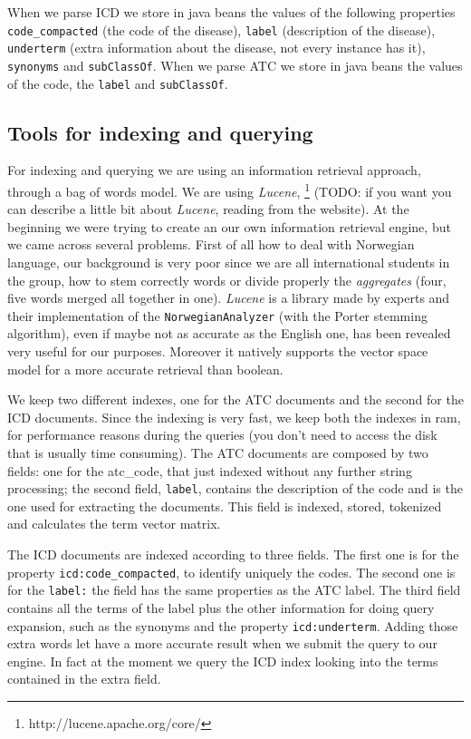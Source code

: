 \documentclass{article}
\begin{document}
When we parse ICD we store in java beans the values of the following properties \texttt{code\_compacted} (the code of the disease), \texttt{label} (description of the disease), \texttt{underterm} (extra information about the disease, not every instance has it), \texttt{synonyms} and \texttt{subClassOf}.
When we parse ATC we store in java beans the values of the code, the \texttt{label} and \texttt{subClassOf}.

\subsection{Tools for indexing and querying}
For indexing and querying we are using an information retrieval approach, through a bag of words model. We are using \emph{Lucene}, \footnote{http://lucene.apache.org/core/}  (TODO: if you want you can describe a little bit about \emph{Lucene}, reading from the website). At the beginning we were trying to create an our own information retrieval engine, but we came across several problems. First of all how to deal with Norwegian language, our background is very poor since we are all international students in the group, how to stem correctly words or divide properly the \emph{aggregates} (four, five words merged all together in one). \emph{Lucene} is a library made by experts and their implementation of the \texttt{NorwegianAnalyzer} (with the Porter stemming algorithm), even if maybe not as accurate as the English one, has been revealed very useful for our purposes. Moreover it natively supports the vector space model for a more accurate retrieval than boolean.

We keep two different indexes, one for the ATC documents and the second for the ICD documents. Since the indexing is very fast, we keep both the indexes in ram, for performance reasons during the queries (you don't need to access the disk that is usually time consuming). The ATC documents are composed by two fields: one for the atc\_code, that just indexed without any further string processing; the second field, \texttt{label}, contains the description of the code and is the one used for extracting the documents. This field is indexed, stored, tokenized and calculates the term vector matrix.

The ICD documents are indexed according to three fields. The first one is for the property \texttt{icd:code\_compacted}, to identify uniquely the codes. The second one is for the \texttt{label:} the field has the same properties as the ATC label. The third field contains all the terms of the label plus the other information for doing query expansion, such as the synonyms and the property \texttt{icd:underterm}. Adding those extra words let have a more accurate result when we submit the query to our engine. In fact at the moment we query the ICD index looking into the terms contained in the extra field.
\end{document}
